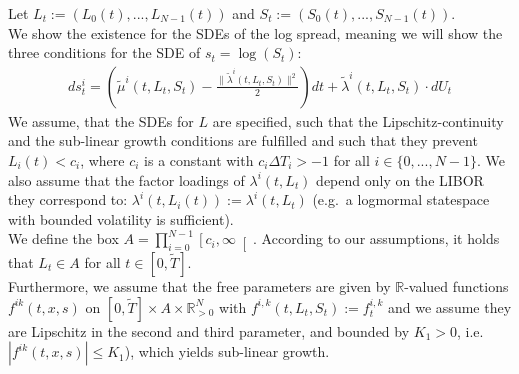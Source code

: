 \documentclass[12pt]{article}
\begin{document}
Let $L_t := \left(L_0(t), ..., L_{N-1}(t)\right)$ and $S_t := \left(S_0(t), ..., S_{N-1}(t)\right)$.\\
We show the existence for the SDEs of the log spread, meaning we will show the three conditions for the SDE of $s_t=\log\left(S_t\right)$:
\begin{align*}
	ds^i_t = \left(\tilde{\mu}^i\left(t,L_t, S_t\right) - \frac{\lVert\tilde{\lambda}^i\left(t,L_t,S_t\right)\rVert ^2}{2}\right) dt
	 + \tilde{\lambda}^i\left(t,L_t, S_t\right) \cdot dU_t
\end{align*}
We assume, that the SDEs for $L$ are specified, such that the Lipschitz-continuity and the sub-linear growth conditions are fulfilled and such that they prevent $L_i(t) < c_i$, where $c_i$ is a constant with $c_i\Delta T_i > -1$ for all $i \in \{0, ..., N-1\}$. We also assume that the factor loadings of $\lambda^i(t, L_t)$ depend only on the LIBOR they correspond to: $\lambda^i(t,L_i(t)) := \lambda^i(t,L_t)$
	(e.g.\ a logmormal statespace with bounded volatility is sufficient). \\
We define the box $A = \prod_{i=0}^{N-1}\left[c_i, \infty\right[$. According to our assumptions, it holds that $L_t\in A$ for all $t\in \left[0,\tilde{T}\right]$.\\
Furthermore, we assume that the free parameters are given by $\mathbb{R}$-valued functions $f^{i k}(t,x,s)$ on $\left[0,\tilde{T}\right]\times A \times \mathbb{R}_{>0}^N$ with $f^{i,k}(t,L_t, S_t) := f^{i,k}_t$ and we assume they are Lipschitz in the second and third parameter, and bounded by $K_1 > 0$, i.e.\ $|f^{ik}(t,x,s)| \le K_1$), which yields sub-linear growth.\\
\end{document}
